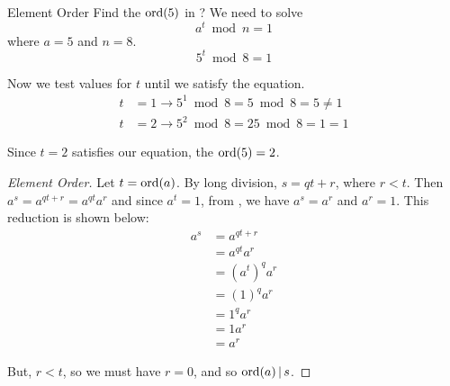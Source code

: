 \begin{example}{Element Order}
  Find the $\operatorname{\operatorname{ord}}(5)$ in ?
  \tcblower{}
  We need to solve
  \begin{equation*}
    a^{t} \bmod n = 1
  \end{equation*}
  where $a = 5$ and $n = 8$.
  \begin{equation*}
    5^{t} \bmod 8 = 1
  \end{equation*}

  Now we test values for $t$ until we satisfy the equation.
  \begin{align*}
    t &= 1 \rightarrow 5^{1} \bmod 8 = 5 \bmod 8 = 5 \neq 1 \\
    t &= 2 \rightarrow 5^{2} \bmod 8 = 25 \bmod 8 = 1 = 1
  \end{align*}

  Since $t=2$ satisfies our equation, the $\operatorname{\operatorname{ord}}(5) = 2$.
\end{example}

\begin{proof}[Element Order]\label{proof:Element_Order}
  Let $t = \operatorname{\operatorname{ord}}(a)$.
  By long division, $s = qt + r$, where $r < t$.
  Then $a^{s} = a^{qt + r} = a^{qt}a^{r}$ and since $a^{t} = 1$, from , we have $a^{s} = a^{r}$ and $a^{r} = 1$.
  This reduction is shown below:
  \begin{align*}
    a^{s} &= a^{qt + r} \\
          &= a^{qt}a^{r} \\
          &= {\left( a^{t} \right)}^{q} a^{r} \\
          &= {\left( 1 \right)}^{q} a^{r} \\
          &= 1^{q} a^{r} \\
          &= 1 a^{r} \\
          &= a^{r}
  \end{align*}

  But, $r<t$, so we must have $r=0$, and so $\operatorname{\operatorname{ord}}(a) \operatorname{\vert} s$.
\end{proof}


